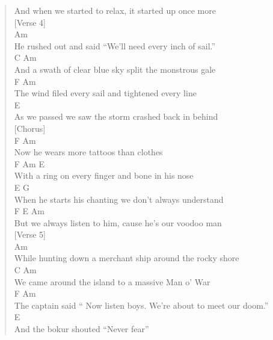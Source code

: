 \documentclass[11pt]{article}
\begin{document}
\begin{verse}
And when we started to relax, it started up once more\\
\vspace*{1em}
[Verse 4]\\
Am\\
He rushed out and said ``We'll need every inch of sail.''\\
C                             Am\\
And a swath of clear blue sky split the monstrous gale\\
\hspace*{4em}F                         Am\\
The wind filed every sail and tightened every line\\
E\\
As we passed we saw the storm crashed back in behind\\
\vspace*{1em}
[Chorus]\\
F                              Am\\
Now he wears more tattoos than clothes\\
\hspace*{7em}F                        Am          E\\
With a ring on every finger and bone in his nose\\
E                                    G\\
When he starts his chanting we don't always understand\\
\hspace*{7em}F             E             Am\\
But we always listen to him, cause he's our voodoo man\\
\vspace*{1em}
[Verse 5]\\
Am\\
While hunting down a merchant ship around the rocky shore\\
\hspace*{3em}C                           Am\\
We came around the island to a massive Man o' War\\
\hspace*{4em}F                                       Am\\
The captain said `` Now listen boys. We're about to meet our doom.''\\
\hspace*{8em}E\\
And the bokur shouted ``Never fear''\\

\end{verse}
\end{document}
